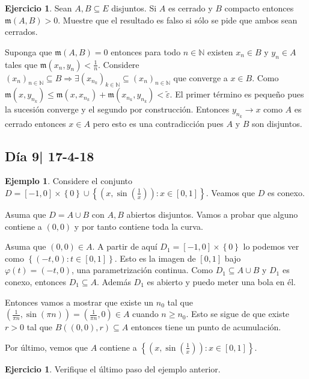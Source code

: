 \documentclass[12pt]{article}
\theoremstyle{plain}
\theoremstyle{definition}
\newtheorem{Ex}[Th]{Ejemplo}               %
\newtheorem{Ej}[Th]{Ejercicio}
\theoremstyle{remark}
\numberwithin{equation}{section}
\newcommand{\bN}{\mathbb{N}}        %
\newcommand{\mm}{\mathfrak{m}}      %
\renewcommand{\geq}{\geqslant}      %
\renewcommand{\leq}{\leqslant}      %
\renewcommand{\:}{\colon}           %
\newcommand{\conj}[1]{\left\lbrace#1\right\rbrace}
\newcommand{\bonj}[1]{\left\lbrack#1\right\rbrack}
\begin{document}
\begin{multicols}{2}
\begin{Ej}
  Sean $A,B\subseteq E$ disjuntos. Si $A$ es cerrado y $B$ compacto entonces $\mm(A,B)>0$. Muestre que el resultado es falso si sólo se pide que ambos sean cerrados.
\end{Ej}

\begin{ptcb}
Suponga que $\mm(A,B)=0$ entonces para todo $n\in\bN$ existen $x_n\in B$ y $y_n\in A$ tales que $\mm(x_n,y_n)<\frac{1}{n}$. Considere $(x_n)_{n\in\bN}\subseteq B\Rightarrow \exists (x_{n_k})_{k\in\bN}\subseteq(x_n)_{n\in\bN}$ que converge a $x\in B$. Como $\mm(x,y_{n_k})\leq \mm(x,x_{n_k})+\mm(x_{n_k},y_{n_k})<\tilde{\varepsilon}$. El primer término es pequeño pues la sucesión converge y el segundo por construcción. Entonces $y_{n_k}\to x$ como $A$ es cerrado entonces $x\in A$ pero esto es una contradicción pues $A$ y $B$ son disjuntos.
\end{ptcb}

\subsection{Día 9| 17-4-18}

\begin{Ex}
  Considere el conjunto $D=\bonj{-1,0}\times\conj{0}\cup\conj{(x,\sin(\frac{1}{x}))\colon x\in\bonj{0,1}}$. Veamos que $D$ es conexo.
\end{Ex}

\begin{ptcb}
Asuma que $D=A\cup B$ con $A,B$ abiertos disjuntos. Vamos a probar que alguno contiene a $(0,0)$ y por tanto contiene toda la curva.\par
  Asuma que $(0,0)\in A$. A partir de aquí $D_1=\bonj{-1,0}\times\conj{0}$ lo podemos ver como $\conj{(-t,0)\colon t\in\bonj{0,1}}$. Esto es la imagen de $\bonj{0,1}$ bajo $\varphi(t)=(-t,0)$, una parametrización continua. Como $D_1\subseteq A\cup B$ y $D_1$ es conexo, entonces $D_1\subseteq A$. Además $D_1$ es abierto y puedo meter una bola en él.\par
  Entonces vamos a mostrar que existe un $n_0$ tal que $(\frac{1}{\pi n},\sin(\pi n))=(\frac{1}{\pi n},0)\in A$ cuando $n\geq n_0$. Esto se sigue de que existe $r>0$ tal que $B((0,0),r)\subseteq A$ entonces tiene un punto de acumulación.\par
  Por último, vemos que $A$ contiene a $\conj{(x,\sin(\frac{1}{x}))\colon x\in\bonj{0,1}}$.
\end{ptcb}

\begin{Ej}
  Verifique el último paso del ejemplo anterior.
\end{Ej}



\end{multicols}
\end{document}
